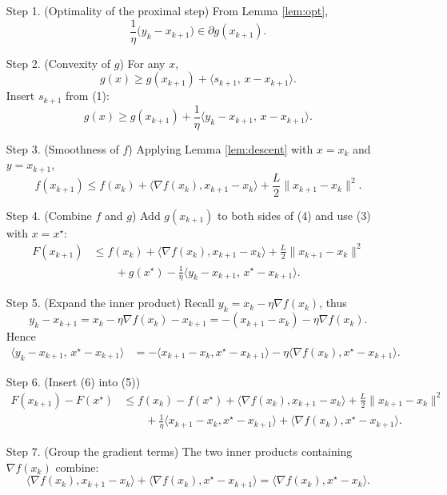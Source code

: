 \documentclass{article}
\begin{document}
\begin{enumerate}
\item[Step 1.] (Optimality of the proximal step)  
From Lemma \ref{lem:opt},
\[
\frac{1}{\eta}\bigl(y_{k}-x_{k+1}\bigr)\in\partial g(x_{k+1}).
\tag{1}
\]

\item[Step 2.] (Convexity of $g$)  
For any $x$,
\[
g(x)\ge g(x_{k+1})+\bigl\langle s_{k+1},\,x-x_{k+1}\bigr\rangle.
\tag{2}
\]
Insert $s_{k+1}$ from (1):
\[
g(x)\ge g(x_{k+1})+\frac{1}{\eta}\bigl\langle y_{k}-x_{k+1},\,x-x_{k+1}\bigr\rangle.
\tag{3}
\]

\item[Step 3.] (Smoothness of $f$)  
Applying Lemma \ref{lem:descent} with $x=x_{k}$ and $y=x_{k+1}$,
\[
f(x_{k+1})\le f(x_{k})+\langle\nabla f(x_{k}),x_{k+1}-x_{k}\rangle
+\frac{L}{2}\|x_{k+1}-x_{k}\|^{2}.
\tag{4}
\]

\item[Step 4.] (Combine $f$ and $g$)  
Add $g(x_{k+1})$ to both sides of (4) and use (3) with $x=x^{\star}$:
\[
\begin{aligned}
F(x_{k+1})
&\le f(x_{k})+\langle\nabla f(x_{k}),x_{k+1}-x_{k}\rangle
+\frac{L}{2}\|x_{k+1}-x_{k}\|^{2}\\
&\qquad+g(x^{\star})-\frac{1}{\eta}\bigl\langle y_{k}-x_{k+1},\,x^{\star}-x_{k+1}\bigr\rangle .
\end{aligned}
\tag{5}
\]

\item[Step 5.] (Expand the inner product)  
Recall $y_{k}=x_{k}-\eta\nabla f(x_{k})$, thus
\[
y_{k}-x_{k+1}=x_{k}-\eta\nabla f(x_{k})-x_{k+1}
=-(x_{k+1}-x_{k})-\eta\nabla f(x_{k}).
\]
Hence
\[
\begin{aligned}
\bigl\langle y_{k}-x_{k+1},\,x^{\star}-x_{k+1}\bigr\rangle
&= -\langle x_{k+1}-x_{k},x^{\star}-x_{k+1}\rangle
-\eta\langle\nabla f(x_{k}),x^{\star}-x_{k+1}\rangle .
\end{aligned}
\tag{6}
\]

\item[Step 6.] (Insert (6) into (5))  
\[
\begin{aligned}
F(x_{k+1})-F(x^{\star})
&\le f(x_{k})-f(x^{\star})
+\langle\nabla f(x_{k}),x_{k+1}-x_{k}\rangle
+\frac{L}{2}\|x_{k+1}-x_{k}\|^{2}\\
&\qquad+\frac{1}{\eta}\langle x_{k+1}-x_{k},x^{\star}-x_{k+1}\rangle
+\langle\nabla f(x_{k}),x^{\star}-x_{k+1}\rangle .
\end{aligned}
\tag{7}
\]

\item[Step 7.] (Group the gradient terms)  
The two inner products containing $\nabla f(x_{k})$ combine:
\[
\langle\nabla f(x_{k}),x_{k+1}-x_{k}\rangle
+\langle\nabla f(x_{k}),x^{\star}-x_{k+1}\rangle
=\langle\nabla f(x_{k}),x^{\star}-x_{k}\rangle .
\tag{8}
\]


\end{enumerate}
\end{document}
